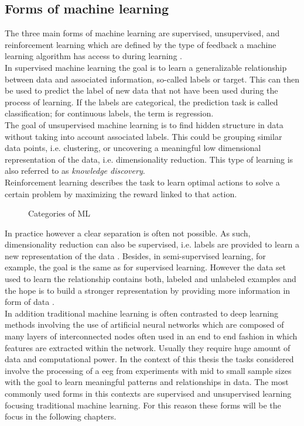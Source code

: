 \subsection{Forms of machine learning}
The three main forms of machine learning are supervised, unsupervised, and reinforcement learning which are defined by the type of feedback a machine learning algorithm has access to during learning \cite{Shalev2014}.\\
In supervised machine learning the goal is to learn a generalizable relationship between data and associated information, so-called labels or target. This can then be used to predict the label of new data that not have been used during the process of learning. If the labels are categorical, the prediction task is called classification; for continuous labels, the term is regression.\\
The goal of unsupervised machine learning is to find hidden structure in data without taking into account associated labels. This could be grouping similar data points, i.e. clustering, or uncovering a meaningful low dimensional representation of the data, i.e. dimensionality reduction. This type of learning is also referred to as \textit{knowledge discovery}\cite{Murphy2012}.\\
Reinforcement learning describes the task to learn optimal actions to solve a certain problem by maximizing the reward linked to that action.

\begin{figure*}[h]
  \caption{Categories of ML}
  \label{fig1:ml_types}
\end{figure*}

In practice however a clear separation is often not possible. As such, dimensionality reduction can also be supervised, i.e. labels are provided to learn a new representation of the data \cite{mcinnes2018umap}. Besides, in semi-supervised learning, for example, the goal is the same as for supervised learning. However the data set used to learn the relationship contains both, labeled and unlabeled examples and the hope is to build a stronger representation by providing more information in form of data \cite{Burkov2019}. \\
In addition traditional machine learning is often contrasted to deep learning methods involving the use of artificial neural networks which are composed of many layers of interconnected nodes often used in an end to end fashion in which features are extracted within the network. Usually they require huge amount of data and computational power. In the context of this thesis the tasks considered involve the processing of a \gls{eeg} from experiments with mid to small sample sizes with the goal to learn meaningful patterns and relationships in data. The most commonly used forms in this contexts are supervised and unsupervised learning focusing traditional machine learning. For this reason these forms will be the focus in the following chapters.

